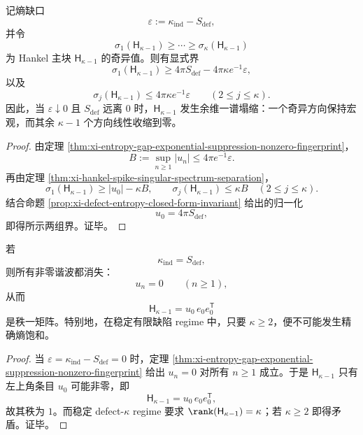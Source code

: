 \begin{theorem}[熵缺口诱导的余维一奇异谱塌缩]\label{thm:derived-hankel-entropy-gap-codim-one-collapse}
记熵缺口
\[
\varepsilon:=\kappa_{\mathrm{ind}}-S_{\mathrm{def}},
\]
并令
\[
\sigma_1(\mathsf H_{\kappa-1})\ge \cdots \ge \sigma_\kappa(\mathsf H_{\kappa-1})
\]
为 Hankel 主块 \(\mathsf H_{\kappa-1}\) 的奇异值。则有显式界
\[
\sigma_1(\mathsf H_{\kappa-1})
\ge
4\pi S_{\mathrm{def}}-4\pi \kappa e^{-1}\varepsilon,
\]
以及
\[
\sigma_j(\mathsf H_{\kappa-1})
\le
4\pi \kappa e^{-1}\varepsilon
\qquad (2\le j\le \kappa).
\]
因此，当 \(\varepsilon\downarrow 0\) 且 \(S_{\mathrm{def}}\) 远离 \(0\) 时，\(\mathsf H_{\kappa-1}\) 发生余维一谱塌缩：一个奇异方向保持宏观，而其余 \(\kappa-1\) 个方向线性收缩到零。
\end{theorem}

\begin{proof}
由定理 \ref{thm:xi-entropy-gap-exponential-suppression-nonzero-fingerprint}，
\[
B:=\sup_{n\ge 1}|u_n|
\le
4\pi e^{-1}\varepsilon.
\]
再由定理 \ref{thm:xi-hankel-spike-singular-spectrum-separation}，
\[
\sigma_1(\mathsf H_{\kappa-1})\ge |u_0|-\kappa B,
\qquad
\sigma_j(\mathsf H_{\kappa-1})\le \kappa B\quad (2\le j\le \kappa).
\]
结合命题 \ref{prop:xi-defect-entropy-closed-form-invariant} 给出的归一化
\[
u_0=4\pi S_{\mathrm{def}},
\]
即得所示两组界。证毕。
\end{proof}

\begin{corollary}[精确熵饱和排斥稳定多缺陷]\label{cor:derived-exact-entropy-saturation-excludes-multidefect}
若
\[
\kappa_{\mathrm{ind}}=S_{\mathrm{def}},
\]
则所有非零谐波都消失：
\[
u_n=0\qquad (n\ge 1),
\]
从而
\[
\mathsf H_{\kappa-1}=u_0\,e_0e_0^{\mathsf T}
\]
是秩一矩阵。特别地，在稳定有限缺陷 regime 中，只要 \(\kappa\ge 2\)，便不可能发生精确熵饱和。
\end{corollary}

\begin{proof}
当 \(\varepsilon=\kappa_{\mathrm{ind}}-S_{\mathrm{def}}=0\) 时，定理 \ref{thm:xi-entropy-gap-exponential-suppression-nonzero-fingerprint} 给出
\(
u_n=0
\)
对所有 \(n\ge 1\) 成立。于是 \(\mathsf H_{\kappa-1}\) 只有左上角条目 \(u_0\) 可能非零，即
\[
\mathsf H_{\kappa-1}=u_0\,e_0e_0^{\mathsf T},
\]
故其秩为 \(1\)。而稳定 defect-\(\kappa\) regime 要求 \(\rank(\mathsf H_{\kappa-1})=\kappa\)；若 \(\kappa\ge 2\) 即得矛盾。证毕。
\end{proof}

